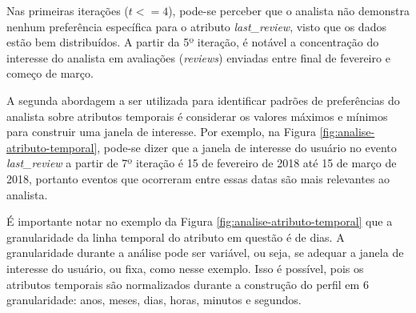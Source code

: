 Nas primeiras iterações ($t <= 4$), pode-se perceber que o analista não demonstra nenhum preferência específica para o atributo {\em last\_review}, visto que os dados estão bem distribuídos. A partir da 5º iteração, é notável a concentração do interesse do analista em avaliações ({\em reviews}) enviadas entre final de fevereiro e começo de março.

A segunda abordagem a ser utilizada para identificar padrões de preferências do analista sobre atributos temporais é considerar os valores máximos e mínimos para construir uma janela de interesse. Por exemplo, na Figura \ref{fig:analise-atributo-temporal}, pode-se dizer que a janela de interesse do usuário no evento {\em last\_review} a partir de 7º iteração é 15 de fevereiro de 2018 até 15 de março de 2018, portanto eventos que ocorreram entre essas datas são mais relevantes ao analista.

É importante notar no exemplo da Figura \ref{fig:analise-atributo-temporal} que a granularidade da linha temporal do atributo em questão é de dias. A granularidade durante a análise pode ser variável, ou seja, se adequar a janela de interesse do usuário, ou fixa, como nesse exemplo. Isso é possível, pois os atributos temporais são normalizados durante a construção do perfil em 6 granularidade: anos, meses, dias, horas, minutos e segundos.